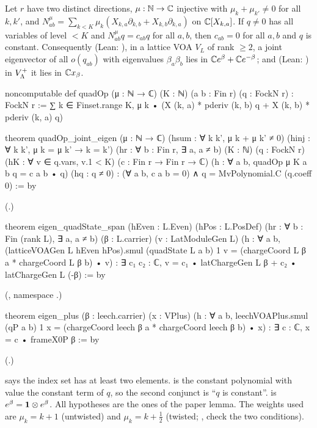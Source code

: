 \begin{lemma}\label{ch20:lem:jointeigen}
Let $r$ have two distinct directions, $\mu:{\mathbb{N}}\to{\mathbb{C}}$ injective with $\mu_k+\mu_{k'}\neq0$ for all $k,k'$, and
$N^\mu_{ab}=\sum_{k<K}\mu_k(X_{k,a}\partial_{k,b}+X_{k,b}\partial_{k,a})$ on ${\mathbb{C}}[X_{k,a}]$.  If $q\neq0$ has all
variables of level $<K$ and $N^\mu_{ab}q=c_{ab}q$ for all $a,b$, then $c_{ab}=0$ for all $a,b$ and $q$ is constant.
Consequently (Lean: ), in a lattice VOA $V_L$ of rank $\ge2$, a joint eigenvector of all
$o(q_{ab})$ with eigenvalues $\beta_a\beta_b$ lies in ${\mathbb{C}} e^\beta+{\mathbb{C}} e^{-\beta}$; and (Lean: ) in
$V_{\Lambda}^{+}$ it lies in ${\mathbb{C}} x_\beta$.
\end{lemma}
\begin{leancode}
noncomputable def quadOp (μ : ℕ → ℂ) (K : ℕ) (a b : Fin r) (q : FockN r) : FockN r :=
  ∑ k ∈ Finset.range K, μ k • (X (k, a) * pderiv (k, b) q + X (k, b) * pderiv (k, a) q)

theorem quadOp_joint_eigen (μ : ℕ → ℂ) (hsum : ∀ k k', μ k + μ k' ≠ 0)
    (hinj : ∀ k k', μ k = μ k' → k = k') (hr : ∀ b : Fin r, ∃ a, a ≠ b) (K : ℕ)
    (q : FockN r) (hK : ∀ v ∈ q.vars, v.1 < K) (c : Fin r → Fin r → ℂ)
    (h : ∀ a b, quadOp μ K a b q = c a b • q) (hq : q ≠ 0) :
    (∀ a b, c a b = 0) ∧ q = MvPolynomial.C (q.coeff 0) := by
\end{leancode}
(.)
\begin{leancode}
theorem eigen_quadState_span (hEven : L.Even) (hPos : L.PosDef)
    (hr : ∀ b : Fin (rank L), ∃ a, a ≠ b) (β : L.carrier) (v : LatModuleGen L)
    (h : ∀ a b, (latticeVOAGen L hEven hPos).smul (quadState L a b) 1 v
      = (chargeCoord L β a * chargeCoord L β b) • v) :
    ∃ c₁ c₂ : ℂ, v = c₁ • latChargeGen L β + c₂ • latChargeGen L (-β) := by
\end{leancode}
(, namespace .)
\begin{leancode}
theorem eigen_plus (β : leech.carrier) (x : VPlus)
    (h : ∀ a b, leechVOAPlus.smul (qP a b) 1 x = (chargeCoord leech β a * chargeCoord leech β b) • x) :
    ∃ c : ℂ, x = c • frameX0P β := by
\end{leancode}
(.)
\begin{dictionary}
 says the index set has at least two elements.   is the
constant polynomial with value the constant term of $q$, so the second conjunct is ``$q$ is constant''.
 is $e^\beta=\mathbf 1\otimes e^\beta$.  All hypotheses are the ones of the paper lemma.  The
weights used are $\mu_k=k+1$ (untwisted) and $\mu_k=k+\tfrac12$ (twisted; ,
 check the two conditions).
\end{dictionary}
